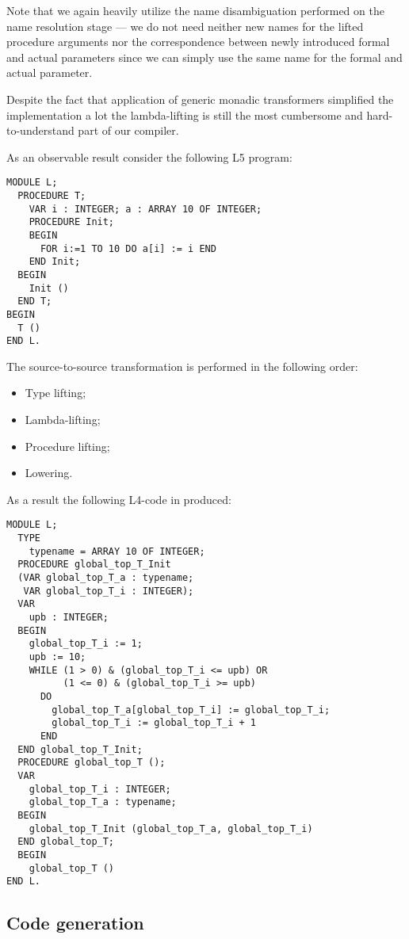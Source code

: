 Note that we again heavily utilize the name disambiguation performed on the name resolution stage --- we do
not need neither new names for the lifted procedure arguments nor the correspondence between newly introduced
formal and actual parameters since we can simply use the same name for the formal and actual parameter.

Despite the fact that application of generic monadic transformers simplified the implementation a lot the
lambda-lifting is still the most cumbersome and hard-to-understand part of our compiler.

As an observable result consider the following L5 program:

\begin{lstlisting}[language=oberon0]
MODULE L;
  PROCEDURE T;
    VAR i : INTEGER; a : ARRAY 10 OF INTEGER;
    PROCEDURE Init;
    BEGIN
      FOR i:=1 TO 10 DO a[i] := i END
    END Init;
  BEGIN
    Init ()  
  END T;
BEGIN
  T ()
END L.
\end{lstlisting}

The source-to-source transformation is performed in the following order:

\begin{itemize}
\item Type lifting;
\item Lambda-lifting;
\item Procedure lifting;
\item Lowering.
\end{itemize}

As a result the following L4-code in produced:

\begin{lstlisting}[language=oberon0]
MODULE L;
  TYPE
    typename = ARRAY 10 OF INTEGER;
  PROCEDURE global_top_T_Init 
  (VAR global_top_T_a : typename; 
   VAR global_top_T_i : INTEGER);
  VAR
    upb : INTEGER;
  BEGIN
    global_top_T_i := 1; 
    upb := 10; 
    WHILE (1 > 0) & (global_top_T_i <= upb) OR 
          (1 <= 0) & (global_top_T_i >= upb)
      DO
        global_top_T_a[global_top_T_i] := global_top_T_i; 
        global_top_T_i := global_top_T_i + 1
      END
  END global_top_T_Init;
  PROCEDURE global_top_T ();
  VAR
    global_top_T_i : INTEGER;
    global_top_T_a : typename;
  BEGIN
    global_top_T_Init (global_top_T_a, global_top_T_i)
  END global_top_T;
  BEGIN
    global_top_T ()
END L.
\end{lstlisting}

\subsection{Code generation}

